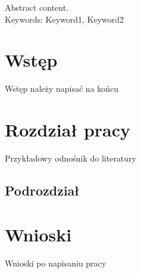 \documentclass[a4paper,12pt]{report}
\newcommand\blankpage{%
    \null
    \thispagestyle{empty}%
    \addtocounter{page}{-1}%
    \newpage}
\begin{document}
\noindent Abstract content. \\

\noindent Keywords: Keyword1, Keyword2 \\

\afterpage{\blankpage}

\newpage

\setcounter{page}{9}
\tableofcontents
\afterpage{\blankpage}
\newpage

\renewcommand*\thesection{\arabic{section}}

\setcounter{page}{11}
\section{Wstęp}
\indent Wstęp należy napisać na końcu

\section{Rozdział pracy}
Przykładowy odnośnik do literatury \cite{Test}

\subsection{Podrozdział}

\section{Wnioski}
Wnioski po napisaniu pracy
\newpage 

\listoffigures

\listoftables



\end{document}
